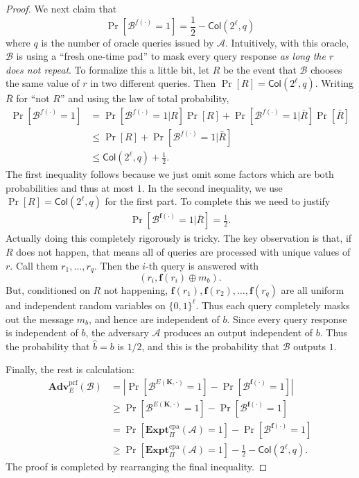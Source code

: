 \documentclass[11pt]{article}
\newcommand{\calA}{\mathcal{A}}
\newcommand{\calB}{\mathcal{B}}
\newcommand{\Adv}{\mathbf{Adv}}
\newcommand{\AdvPRF}[2]{\Adv^{\mathrm{prf}}_{#1}({#2})}
\newcommand{\bits}{\{0,1\}}
\newcommand{\bK}{\mathbf{K}}
\newcommand{\bof}{\mathbf{f}}
\newcommand{\ExptCPA}{\mathbf{Expt}^{\mathrm{cpa}}}
\newcommand{\bhat}{\hat{b}}
\newcommand{\Col}{\mathsf{Col}}
\begin{document}
\begin{proof}
    We next claim that
    \[
        \Pr[\calB^{f(\cdot)}=1] = \frac{1}{2} - \Col(2^\ell,q)
    \]
    where $q$ is the number of oracle queries issued by $\calA$.  Intuitively,
    with this oracle, $\calB$ is using a ``fresh one-time pad'' to mask every
    query response \emph{as long the $r$ does not repeat}. To formalize
    this a little bit,  let $R$ be the event that $\calB$ chooses the
    same value of $r$ in two different queries. Then $\Pr[R] = \Col(2^\ell,q)$.
    Writing $\bar{R}$ for ``not $R$'' and using the law of total probability,
    \begin{align*}
        \Pr[\calB^{f(\cdot)}=1] 
        & = \Pr[\calB^{f(\cdot)}=1|R]\Pr[R] 
             + \Pr[\calB^{f(\cdot)}=1|\bar{R}]\Pr[\bar{R}]  \\
        & \leq \Pr[R] 
             + \Pr[\calB^{f(\cdot)}=1|\bar{R}] \\
        & \leq \Col(2^\ell,q) + \frac{1}{2}. 
    \end{align*}
    The first inequality follows because we just omit some factors which are
    both probabilities and thus at most $1$. In the second inequality,
    we use $\Pr[R]=\Col(2^\ell,q)$ for the first part. To complete this
    we need to justify
    \begin{align*}
        \Pr[\calB^{\bof(\cdot)}=1|\bar{R}] = \frac{1}{2}. 
    \end{align*}
    Actually doing this completely rigorously is tricky. The key observation
    is that, if $R$ does not happen, that means all of queries are processed
    with unique values of $r$. Call them $r_1,\ldots,r_q$. Then the $i$-th
    query is answered with
    \[
        (r_i, \bof(r_i)\oplus m_b).
    \]
    But, conditioned on $R$ not happening,
    $\bof(r_1),\bof(r_2),\ldots,\bof(r_q)$ are all uniform and independent
    random variables on $\bits^\ell$. Thus each query completely masks out
    the message $m_b$, and hence are independent of $b$. Since every query
    response is independent of $b$, the adversary $\calA$ produces an output
    independent of $b$. Thus the probability that $\bhat=b$ is $1/2$, and
    this is the probability that $\calB$ outputs $1$.

    Finally, the rest is calculation:
    \begin{align*}
        \AdvPRF{E}{\calB} 
        & = |\Pr[\calB^{E(\bK,\cdot)}=1] - \Pr[\calB^{\bof(\cdot)}=1]| \\
        & \geq  \Pr[\calB^{E(\bK,\cdot)}=1] - \Pr[\calB^{\bof(\cdot)}=1] \\
        & =  \Pr[\ExptCPA_{\Pi}(\calA)=1] - \Pr[\calB^{\bof(\cdot)}=1] \\
        & \geq  \Pr[\ExptCPA_{\Pi}(\calA)=1] - \frac{1}{2} - \Col(2^\ell,q).
    \end{align*}
    The proof is completed by rearranging the final inequality.
\end{proof}
\end{document}
